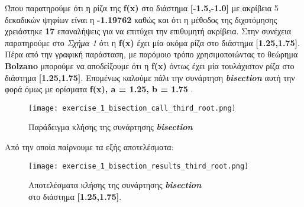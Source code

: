 \documentclass[First Project.tex]{subfiles}
\begin{document}
Ώπου παρατηρούμε ότι η ρίζα της \textlatin{\textbf{f(x)}} στο διάστημα \textlatin{\textbf{[-1.5,-1.0]}} με ακρίβεια 5 δεκαδικών ψηφίων 
είναι η \textbf{-1.19762} καθώς και ότι η μέθοδος της διχοτόμησης χρειάστηκε \textbf{17} επαναλήψεις για να επιτύχει την επιθυμητή ακρίβεια.
Στην συνέχεια παρατηρούμε στο \textit{Σχήμα 1} ότι η \textlatin{\textbf{f(x)}} έχει μία ακόμα ρίζα στο διάστημα \textlatin{\textbf{[1.25,1.75]}}.
Πέρα από την γραφική παράσταση, με παρόμοιο τρόπο χρησιμοποιώντας το θεώρημα \textlatin{\textbf{Bolzano}} μπορούμε να αποδείξουμε ότι η
\textlatin{\textbf{f(x)}} όντως έχει μία τουλάχιστον ρίζα στο διάστημα \textlatin{\textbf{[1.25,1.75]}}. Επομένως καλούμε πάλι την συνάρτηση
\textit{\textlatin{\textbf{bisection}}} αυτή την φορά όμως με ορίσματα \textlatin{\textbf{f(x), a = 1.25, b = 1.75 }}.
\vspace{5px}
\begin{figure}[hp]
    \centering
    \captionsetup{justification=centering}
    \begin{center}
        \texttt{[image: exercise\_1\_bisection\_call\_third\_root.png]}    
        \caption{Παράδειγμα κλήσης της συνάρτησης \textit{\textlatin{\textbf{bisection}}}}
    \end{center}
\end{figure}

Από την οποία παίρνουμε τα εξής αποτελέσματα:
\begin{figure}[hp]
    \centering
    \captionsetup{justification=centering}
    \begin{center}
    \texttt{[image: exercise\_1\_bisection\_results\_third\_root.png]}    
    \caption{ Αποτελέσματα κλήσης της συνάρτησης \textit{\textlatin{\textbf{bisection}}} \\ στο διάστημα \textlatin{\textbf{[1.25,1.75]}}. }
    \end{center}
\end{figure}
\end{document}
